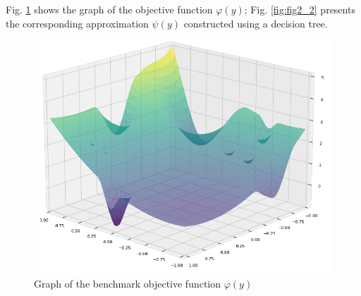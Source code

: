\documentclass[runningheads]{llncs}
\begin{document}




Fig. \ref{fig:fig2} shows the graph of the objective function $\varphi(y)$; Fig. \ref{fig:fig2_2} presents the corresponding approximation $\psi(y)$ constructed using a decision tree.
\begin{figure}
	\begin{center}
		\begin{minipage}[h]{0.8\linewidth}
			\includegraphics[width=1\linewidth]{figure/fig5.png}
			\caption{Graph of the benchmark objective function $\varphi(y)$} %
			\label{fig:fig2}
		\end{minipage}
	\end{center}
\end{figure}	
\end{document}
